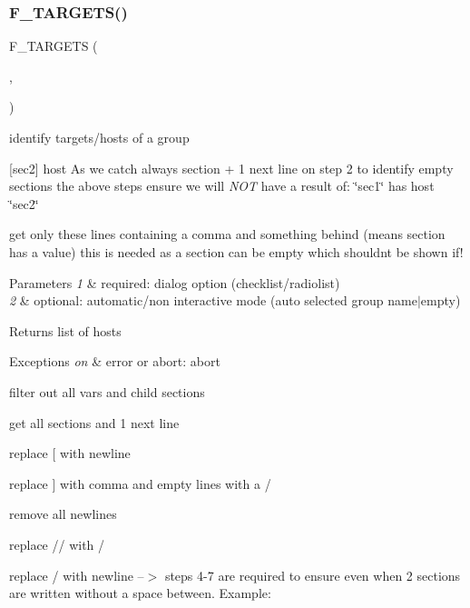 \subsubsection{\texorpdfstring{F\+\_\+\+T\+A\+R\+G\+E\+T\+S()}{F\_TARGETS()}}
{\footnotesize\ttfamily F\+\_\+\+T\+A\+R\+G\+E\+TS (\begin{DoxyParamCaption}\item[{1}]{,  }\item[{2}]{ }\end{DoxyParamCaption})}



identify targets/hosts of a group 

\mbox{[}sec2\mbox{]} host As we catch always section + 1 next line on step 2 to identify empty sections the above steps ensure we will {\itshape N\+OT} have a result of\+: \char`\"{}sec1\char`\"{} has host \char`\"{}sec2\char`\"{}
\begin{DoxyEnumerate}
\item get only these lines containing a comma and something behind (means section has a value) this is needed as a section can be empty which shouldnt be shown if!
\end{DoxyEnumerate}


\begin{DoxyParams}{Parameters}
{\em 1} & required\+: dialog option (checklist/radiolist) \\
\hline
{\em 2} & optional\+: automatic/non interactive mode (auto selected group name$\vert$empty) \\
\hline
\end{DoxyParams}
\begin{DoxyReturn}{Returns}
list of hosts 
\end{DoxyReturn}

\begin{DoxyExceptions}{Exceptions}
{\em on} & error or abort\+: abort\\
\hline
\end{DoxyExceptions}

\begin{DoxyEnumerate}
\item filter out all vars and child sections
\item get all sections and 1 next line
\item replace \mbox{[} with newline
\item replace \mbox{]} with comma and empty lines with a /
\item remove all newlines
\item replace // with /
\item replace / with newline --$>$ steps 4-\/7 are required to ensure even when 2 sections are written without a space between. Example\+: 
\end{DoxyEnumerate}

